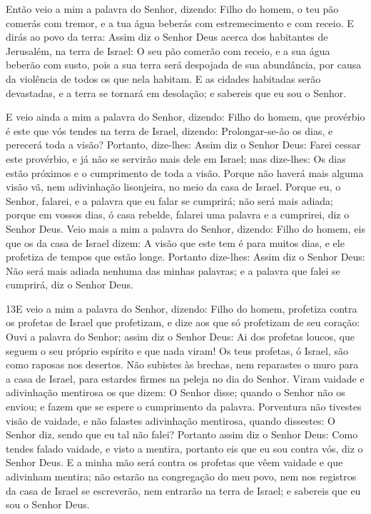 Então veio a mim a palavra do Senhor, dizendo: Filho do
homem, o teu pão comerás com tremor, e a tua água beberás com
estremecimento e com receio. E dirás ao povo da terra: Assim
diz o Senhor Deus acerca dos habitantes de Jerusalém, na terra de
Israel: O seu pão comerão com receio, e a sua água beberão com
susto, pois a sua terra será despojada de sua abundância, por causa
da violência de todos os que nela habitam. E as cidades
habitadas serão devastadas, e a terra se tornará em desolação; e
sabereis que eu sou o Senhor.

E veio ainda a mim a palavra do Senhor, dizendo: Filho do
homem, que provérbio é este que vós tendes na terra de Israel,
dizendo: Prolongar-se-ão os dias, e perecerá toda a visão?
Portanto, dize-lhes: Assim diz o Senhor Deus: Farei cessar
este provérbio, e já não se servirão mais dele em Israel; mas
dize-lhes: Os dias estão próximos e o cumprimento de toda a visão.
Porque não haverá mais alguma visão vã, nem adivinhação
lisonjeira, no meio da casa de Israel. Porque eu, o Senhor,
falarei, e a palavra que eu falar se cumprirá; não será mais adiada;
porque em vossos dias, ó casa rebelde, falarei uma palavra e a
cumprirei, diz o Senhor Deus. Veio mais a mim a palavra do
Senhor, dizendo: Filho do homem, eis que os da casa de Israel
dizem: A visão que este tem é para muitos dias, e ele profetiza de
tempos que estão longe. Portanto dize-lhes: Assim diz o
Senhor Deus: Não será mais adiada nenhuma das minhas palavras; e a
palavra que falei se cumprirá, diz o Senhor Deus.

\medskip

\lettrine{13} E veio a mim a palavra do Senhor, dizendo:
Filho do homem, profetiza contra os profetas de Israel que
profetizam, e dize aos que só profetizam de seu coração: Ouvi a
palavra do Senhor; assim diz o Senhor Deus: Ai dos profetas
loucos, que seguem o seu próprio espírito e que nada viram! Os
teus profetas, ó Israel, são como raposas nos desertos. Não
subistes às brechas, nem reparastes o muro para a casa de Israel,
para estardes firmes na peleja no dia do Senhor. Viram vaidade e
adivinhação mentirosa os que dizem: O Senhor disse; quando o Senhor
não os enviou; e fazem que se espere o cumprimento da palavra.
Porventura não tivestes visão de vaidade, e não falastes
adivinhação mentirosa, quando dissestes: O Senhor diz, sendo que eu
tal não falei? Portanto assim diz o Senhor Deus: Como tendes
falado vaidade, e visto a mentira, portanto eis que eu sou contra
vós, diz o Senhor Deus. E a minha mão será contra os profetas
que vêem vaidade e que adivinham mentira; não estarão na congregação
do meu povo, nem nos registros da casa de Israel se escreverão, nem
entrarão na terra de Israel; e sabereis que eu sou o Senhor Deus.

